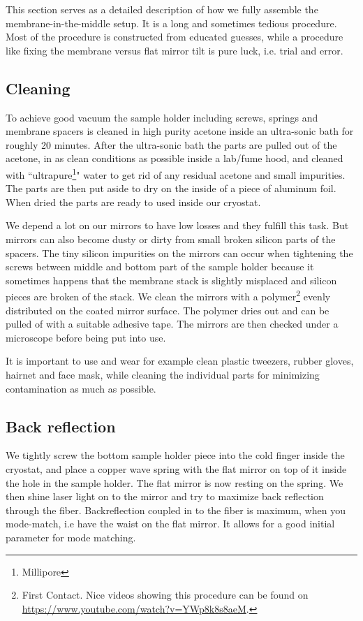 This section serves as a detailed description of how we fully assemble the membrane-in-the-middle setup. It is a long and sometimes tedious procedure. Most of the procedure is constructed from educated guesses, while a procedure like fixing the membrane versus flat mirror tilt is pure luck, i.e. trial and error.

\subsection{Cleaning}
To achieve good vacuum the sample holder including screws, springs and membrane spacers is cleaned in high purity acetone inside an ultra-sonic bath for roughly 20 minutes. After the ultra-sonic bath the parts are pulled out of the acetone, in as clean conditions as possible inside a lab/fume hood, and cleaned with ``ultrapure\footnote{Millipore}" water to get rid of any residual acetone and small impurities. The parts are then put aside to dry on the inside of a piece of aluminum foil. When dried the parts are ready to used inside our cryostat.

We depend a lot on our mirrors to have low losses and they fulfill this task. But mirrors can also become dusty or dirty from small broken silicon parts of the spacers. The tiny silicon impurities on the mirrors can occur when tightening the screws between middle and bottom part of the sample holder because it sometimes happens that the membrane stack is slightly misplaced and silicon pieces are broken of the stack. We clean the mirrors with a polymer\footnote{First Contact. Nice videos showing this procedure can be found on \url{https://www.youtube.com/watch?v=YWp8k8s8aeM}.} evenly distributed on the coated mirror surface. The polymer dries out and can be pulled of with a suitable adhesive tape. The mirrors are then checked under a microscope before being put into use.

It is important to use and wear for example clean plastic tweezers, rubber gloves, hairnet and face mask, while cleaning the individual parts for minimizing contamination as much as possible.

\subsection{Back reflection}
We tightly screw the bottom sample holder piece into the cold finger inside the cryostat, and place a copper wave spring with the flat mirror on top of it inside the hole in the sample holder. The flat mirror is now resting on the spring. We then shine laser light on to the mirror and try to maximize back reflection through the fiber. Backreflection coupled in to the fiber is maximum, when you mode-match, i.e have the waist on the flat mirror. It allows for a good initial parameter for mode matching.

